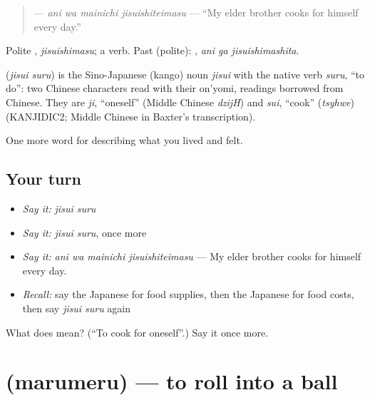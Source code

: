 \begin{quote}
\textbf{  } — \emph{ani wa mainichi jisuishiteimasu} — \textquotedblleft{}My elder brother cooks for himself every day.\textquotedblright{}
\end{quote}

Polite \textbf{}, \emph{jisuishimasu}; a  verb. Past (polite): \textbf{ }, \emph{ani ga jisuishimashita}.

\begin{cousinweb}
\textbf{} (\emph{jisui suru}) is the Sino-Japanese (kango) noun \emph{jisui} with the native verb \emph{suru}, \textquotedblleft{}to do\textquotedblright{}: two Chinese characters read with their on'yomi, readings borrowed from Chinese. They are \emph{ji}, \textquotedblleft{}oneself\textquotedblright{} (Middle Chinese \emph{dzijH}) and \emph{sui}, \textquotedblleft{}cook\textquotedblright{} (\emph{tsyhwe}) (KANJIDIC2; Middle Chinese in Baxter's transcription).
\end{cousinweb}

\begin{grammarlens}[title={What you've built}]
One more word for describing what you lived and felt.
\end{grammarlens}

\subsection*{Your turn}
\begin{itemize}
\raggedright
  \item \emph{Say it:} \emph{jisui suru}
  \item \emph{Say it:} \emph{jisui suru}, once more
  \item \emph{Say it:} \emph{ani wa mainichi jisuishiteimasu} — My elder brother cooks for himself every day.
  \item \emph{Recall:} say the Japanese for food supplies, then the Japanese for food costs, then say \emph{jisui suru} again
\end{itemize}

\begin{tcolorbox}[breakable,colback=teal!4,colframe=teal!35!black,title={Before you move on}]
What does  mean? (\textquotedblleft{}To cook for oneself\textquotedblright{}.) Say it once more.
\end{tcolorbox}
\section[\texorpdfstring{\ja{まるめる} (marumeru)}{まるめる (marumeru)}]{ (marumeru) — to roll into a ball}

